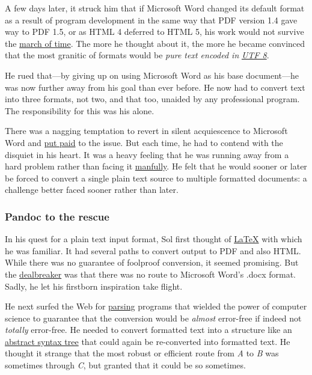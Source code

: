 \documentclass[
  british,
  a4paper,
  rgb,
  dvipsnames,
  svgnames,
  hyphens]{article}
\begin{document}
A few days later, it struck him that if Microsoft Word changed its
default format as a result of program development in the same way that
PDF version 1.4 gave way to PDF 1.5, or as HTML 4 deferred to HTML 5,
his work would not survive the
\href{https://www.youtube.com/watch?v=FTLylKsI8xY\&feature=emb_imp_woyt}{march
of time}. The more he thought about it, the more he became convinced
that the most granitic of formats would be \emph{pure text encoded in}
\href{https://en.wikipedia.org/wiki/UTF-8}{\emph{UTF 8}}.

He rued that---by giving up on using Microsoft Word as his base
document---he was now further away from his goal than ever before. He
now had to convert text into three formats, not two, and that too,
unaided by any professional program. The responsibility for this was his
alone.

There was a nagging temptation to revert in silent acquiescence to
Microsoft Word and
\href{https://www.phrases.org.uk/meanings/put-paid-to.html}{put paid} to
the issue. But each time, he had to contend with the disquiet in his
heart. It was a heavy feeling that he was running away from a hard
problem rather than facing it
\href{https://www.dictionary.com/browse/manful}{manfully}. He felt that
he would sooner or later be forced to convert a single plain text source
to multiple formatted documents: a challenge better faced sooner rather
than later.

\hypertarget{pandoc-to-the-rescue}{%
\subsubsection{Pandoc to the rescue}\label{pandoc-to-the-rescue}}

In his quest for a plain text input format, Sol first thought of
\href{https://en.wikipedia.org/wiki/LaTeX}{LaTeX} with which he was
familiar. It had several paths to convert output to PDF and also HTML.
While there was no guarantee of foolproof conversion, it seemed
promising. But the
\href{https://dictionary.cambridge.org/dictionary/english/dealbreaker}{dealbreaker}
was that there was no route to Microsoft Word's .docx format. Sadly, he
let his firstborn inspiration take flight.

He next surfed the Web for
\href{https://themightyprogrammer.dev/article/parsing}{parsing} programs
that wielded the power of computer science to guarantee that the
conversion would be \emph{almost} error-free if indeed not
\emph{totally} error-free. He needed to convert formatted text into a
structure like an
\href{https://en.wikipedia.org/wiki/Abstract_syntax_tree}{abstract
syntax tree} that could again be re-converted into formatted text. He
thought it strange that the most robust or efficient route from \emph{A}
to \emph{B} was sometimes through \emph{C}, but granted that it could be
so sometimes.
\end{document}
